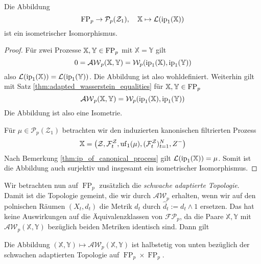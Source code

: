 \begin{lemma}\label{thm:isometric_fp_pz}
    Die Abbildung 
    $$\operatorname{FP}_p \rightarrow \mathcal{P}_p(\mathcal{Z}_1), \quad \mathbb{X} \mapsto \mathcal{L}(\operatorname{ip}_1(\mathbb{X}))$$
     ist ein isometrischer Isomorphismus.
\end{lemma}
\begin{proof}
    Für zwei Prozesse $\mathbb{X,Y} \in \operatorname{FP}_p$ mit $\mathbb{X}=\mathbb{Y}$ gilt 
    $$0=\mathcal{AW}_p(\mathbb{X}, \mathbb{Y}) = \mathcal{W}_p(\operatorname{ip}_1(\mathbb{X}), \operatorname{ip}_1(\mathbb{Y}))$$
    also $\mathcal{L}(\operatorname{ip}_1(\mathbb{X})) = \mathcal{L}(\operatorname{ip}_1(\mathbb{Y}))$. Die Abbildung ist also wohldefiniert. Weiterhin gilt mit Satz \ref{thm:adapted_wasserstein_equalities} für $\mathbb{X,Y} \in \operatorname{FP}_p$
    $$\mathcal{AW}_p(\mathbb{X,Y}) = \mathcal{W}_p(\operatorname{ip}_1(\mathbb{X}), \operatorname{ip}_1(\mathbb{Y}))$$
    Die Abbildung ist also eine Isometrie. 

    Für $\mu \in \mathcal{P}_p(\mathcal{Z}_1)$ betrachten wir den induzierten kanonischen filtrierten Prozess
    $$\mathbb{X} = \left( \mathcal{Z}, \mathcal{F}_t^\mathcal{Z}, \operatorname{uf}_1(\mu), (\mathcal{F}_t^\mathcal{Z})_{t=1}^N, Z^-\right)$$
    Nach Bemerkung \ref{thm:ip_of_canonical_process} gilt $\mathcal{L}(\operatorname{ip}_1(\mathbb{X})) = \mu$. Somit ist die Abbildung auch surjektiv und insgesamt ein isometrischer Isomorphismus.
\end{proof}
Wir betrachten nun auf $\operatorname{FP}_p$ zusätzlich die \emph{schwache adaptierte Topologie}. Damit ist die Topologie gemeint, die wir durch $\mathcal{AW}_p$ erhalten, wenn wir auf den polnischen Räumen $(X_t, d_t)$ die Metrik $d_t$ durch $\widehat{d}_t := d_t \wedge 1$ ersetzen. Das hat keine Auswirkungen auf die Äquivalenzklassen von $\mathcal{FP}_p$, da die Paare $\mathbb{X,Y}$ mit $\mathcal{AW}_p(\mathbb{X,Y})$ bezüglich beiden Metriken identisch sind. Dann gilt
\begin{lemma}%
    Die Abbildung $(\mathbb{X,Y}) \mapsto \mathcal{AW}_p(\mathbb{X,Y})$ ist halbstetig von unten bezüglich der schwachen adaptierten Topologie auf $\operatorname{FP}_p\times \operatorname{FP}_p$.
\end{lemma}
